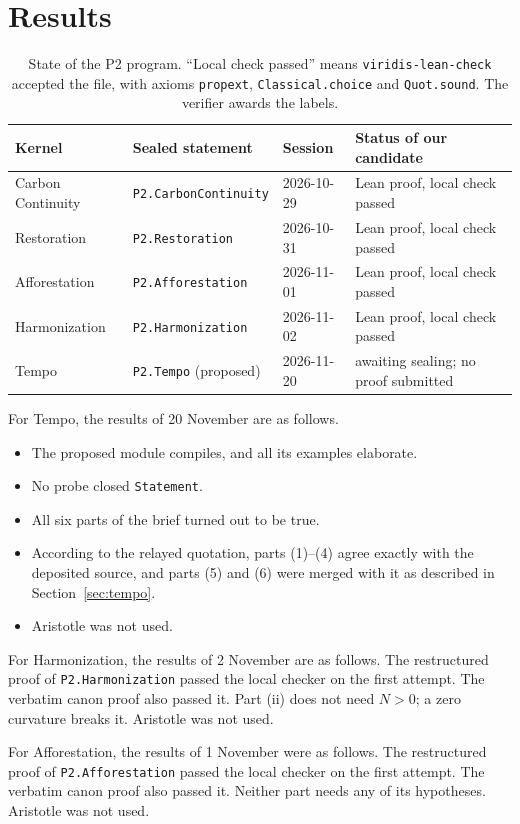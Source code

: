 \documentclass[11pt]{article}
\theoremstyle{definition}
\theoremstyle{remark}
\begin{document}
\section{Results}
\begin{table}[h]
\centering\small
\begin{tabular}{@{}llll@{}}
\toprule
Kernel & Sealed statement & Session & Status of our candidate \\
\midrule
Carbon Continuity & \texttt{P2.CarbonContinuity} & 2026-10-29 & Lean proof, local check passed \\
Restoration & \texttt{P2.Restoration} & 2026-10-31 & Lean proof, local check passed \\
Afforestation & \texttt{P2.Afforestation} & 2026-11-01 & Lean proof, local check passed \\
Harmonization & \texttt{P2.Harmonization} & 2026-11-02 & Lean proof, local check passed \\
Tempo & \texttt{P2.Tempo} (proposed) & 2026-11-20 & awaiting sealing; no proof submitted \\
\bottomrule
\end{tabular}
\caption{State of the P2 program. ``Local check passed'' means \texttt{viridis-lean-check} accepted the file, with axioms
\texttt{propext}, \texttt{Classical.choice} and \texttt{Quot.sound}. The verifier awards the labels.}
\end{table}
For Tempo, the results of 20 November are as follows.
\begin{itemize}
\item The proposed module compiles, and all its examples elaborate.
\item No probe closed \texttt{Statement}.
\item All six parts of the brief turned out to be true.
\item According to the relayed quotation, parts (1)--(4) agree exactly with the deposited source, and parts (5) and (6) were merged with it as described in Section~\ref{sec:tempo}.
\item Aristotle was not used.
\end{itemize}

For Harmonization, the results of 2 November are as follows.
The restructured proof of \texttt{P2.Harmonization} passed the local checker on the first attempt.
The verbatim canon proof also passed it. Part (ii) does not need $N>0$; a zero curvature breaks it.
Aristotle was not used.

For Afforestation, the results of 1 November were as follows.
The restructured proof of \texttt{P2.Afforestation} passed the local checker on the first attempt.
The verbatim canon proof also passed it. Neither part needs any of its hypotheses.
Aristotle was not used.
\end{document}
